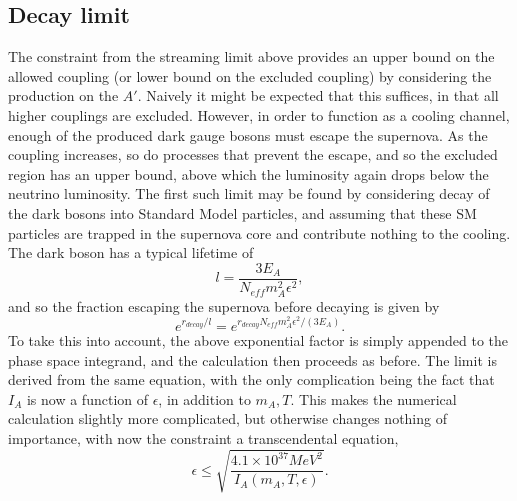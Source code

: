 \documentclass[nofootinbib,aps,prd,preprint,superscriptaddress]{revtex4}
\newcommand{\beq}{\begin{equation}}
\newcommand{\eeq}{\end{equation}}
\begin{document}
\subsection{Decay limit}
The constraint from the streaming limit above provides an upper bound on the allowed coupling (or lower bound on the excluded coupling) by considering the production on the $A'$. Naively it might be expected that this suffices, in that all higher couplings are excluded. However, in order to function as a cooling channel, enough of the produced dark gauge bosons must escape the supernova. As the coupling increases, so do processes that prevent the escape, and so the excluded region has an upper bound, above which the luminosity again drops below the neutrino luminosity. The first such limit may be found by considering decay of the dark bosons into Standard Model particles, and assuming that these SM particles are trapped in the supernova core and contribute nothing to the cooling. The dark boson has a typical lifetime of 
\beq
l = \frac{3 E_{A}}{N_{eff} m_A^2 \epsilon^2},
\eeq
and so the fraction escaping the supernova before decaying is given by 
\beq
e^{r_{decay}/l} = e^{r_{decay} N_{eff} m_A^2 \epsilon^2/(3 E_A)}.
\eeq
To take this into account, the above exponential factor is simply appended to the phase space integrand, and the calculation then proceeds as before. The limit is derived from the same equation, with the only complication being the fact that $ I_A $ is now a function of $ \epsilon $, in addition to $ m_A, T $. This makes the numerical calculation slightly more complicated, but otherwise changes nothing of importance, with now the constraint a transcendental equation,  
\beq
\epsilon \le \sqrt{\frac{4.1 \times 10^{37} MeV^2}{I_A(m_A, T, \epsilon)}}.
\eeq
	
	
\end{document}
